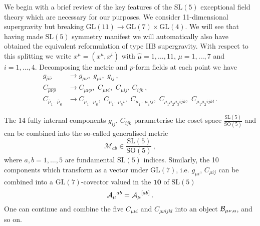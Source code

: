 \documentclass{PoS}
\newcommand{\SL}[1]{\mathrm{SL}( #1 )}
\newcommand{\GL}[1]{\mathrm{GL}( #1 )}
\newcommand{\SO}[1]{\mathrm{SO}( #1 )}
\newcommand{\TA}{{\cal A}}
\newcommand{\TB}{{\cal B}}
\newcommand{\gM}{\mathcal{M}}
\begin{document}
We begin with a brief review of the key features of the $\SL{5}$ exceptional field theory \cite{Berman:2010is,Hohm:2013vpa,Musaev:2015ces} which are necessary for our purposes. We consider 11-dimensional supergravity but breaking $\GL{11} \longrightarrow \GL{7} \times \GL{4}$. We will see that having made $\SL{5}$ symmetry manifest we will automatically also have obtained the equivalent reformulation of type IIB supergravity. With respect to this splitting we write $x^{\hat{\mu}} = \left(x^\mu, x^i\right)$ with $\hat{\mu} = 1, \ldots, 11$, $\mu = 1, \ldots, 7$ and $i = 1, \ldots, 4$. Decomposing the metric and $p$-form fields at each point we have
\begin{equation}
 \begin{split}
  g_{\hat{\mu}\hat{\nu}} &\longrightarrow g_{\mu\nu}, \,\, g_{\mu i}, \,\, g_{ij} \,, \\
  C_{\hat{\mu}\hat{\nu}\hat{\rho}} &\longrightarrow C_{\mu\nu\rho}, \,\, C_{\mu\nu i}, \,\, C_{\mu ij}, \, C_{ijk} \,, \\
  C_{\hat{\mu}_1\ldots \hat{\mu}_6} &\longrightarrow C_{\mu_1\ldots \mu_6} ,\,\, C_{\mu_1\ldots \mu_5 i} ,\,\, C_{\mu_1\ldots \mu_4 i j} ,\,\, C_{\mu_1 \mu_2 \mu_3 ijk} ,\,\, C_{\mu_1 \mu_2 ijkl} \,.
 \end{split}
\end{equation}

The 14 fully internal components $g_{ij}$, $C_{ijk}$ parameterise the coset space $\frac{\SL{5}}{\SO{5}}$ and can be combined into the so-called generalised metric
\begin{equation}
 \gM_{ab} \in \frac{\SL{5}}{\SO{5}} \,,
\end{equation}
where $a, b = 1, \ldots, 5$ are fundamental $\SL{5}$ indices. Similarly, the 10 components which transform as a vector under $\GL{7}$, i.e. $g_{\mu i}$, $C_{\mu ij}$ can be combined into a $\GL{7}$-covector valued in the $\mathbf{10}$ of $\SL{5}$
\begin{equation}
 \TA_\mu{}^{ab} = \TA_\mu{}^{[ab]} \,.
\end{equation}
One can continue and combine the five $C_{\mu\nu i}$ and $C_{\mu\nu ijkl}$ into an object $\TB_{\mu\nu,a}$, and so on.
\end{document}
